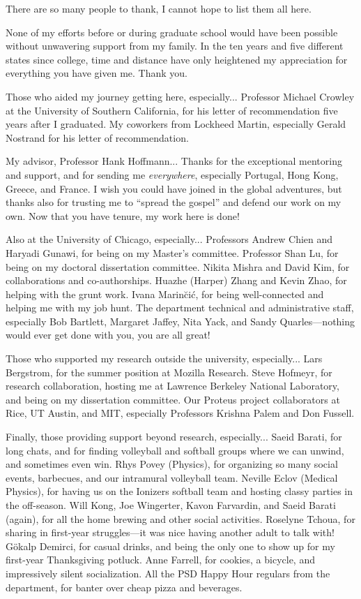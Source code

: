There are so many people to thank, I cannot hope to list them all here.

None of my efforts before or during graduate school would have been possible without unwavering support from my family.
In the ten years and five different states since college, time and distance have only heightened my appreciation for everything you have given me.
Thank you.

Those who aided my journey getting here, especially...
Professor Michael Crowley at the University of Southern California, for his letter of recommendation five years after I graduated.
My coworkers from Lockheed Martin, especially Gerald Nostrand for his letter of recommendation. %

My advisor, Professor Hank Hoffmann...
Thanks for the exceptional mentoring and support, and for sending me \emph{everywhere}, especially Portugal, Hong Kong, Greece, and France.
I wish you could have joined in the global adventures, but thanks also for trusting me to ``spread the gospel'' and defend our work on my own.
Now that you have tenure, my work here is done!

Also at the University of Chicago, especially...
Professors Andrew Chien and Haryadi Gunawi, for being on my Master's committee.
Professor Shan Lu, for being on my doctoral dissertation committee.
Nikita Mishra and David Kim, for collaborations and co-authorships.
Huazhe (Harper) Zhang and Kevin Zhao, for helping with the grunt work.
Ivana Marin{\u c}i{\'c}, for being well-connected and helping me with my job hunt.
The department technical and administrative staff, especially Bob Bartlett, Margaret Jaffey, Nita Yack, and Sandy Quarles---nothing would ever get done with you, you are all great!

Those who supported my research outside the university, especially...
Lars Bergstrom, for the summer position at Mozilla Research.
Steve Hofmeyr, for research collaboration, hosting me at Lawrence Berkeley National Laboratory, and being on my dissertation committee.
Our Proteus project collaborators at Rice, UT Austin, and MIT, especially Professors Krishna Palem and Don Fussell.

Finally, those providing support beyond research, especially...
Saeid Barati, for long chats, and for finding volleyball and softball groups where we can unwind, and sometimes even win.
Rhys Povey (Physics), for organizing so many social events, barbecues, and our intramural volleyball team.
Neville Eclov (Medical Physics), for having us on the Ionizers softball team and hosting classy parties in the off-season.
Will Kong, Joe Wingerter, Kavon Farvardin, and Saeid Barati (again), for all the home brewing and other social activities.
Roselyne Tchoua, for sharing in first-year struggles---it was nice having another adult to talk with!
G{\"o}kalp Demirci, for casual drinks, and being the only one to show up for my first-year Thanksgiving potluck.
Anne Farrell, for cookies, a bicycle, and impressively silent socialization.
All the PSD Happy Hour regulars from the department, for banter over cheap pizza and beverages.

